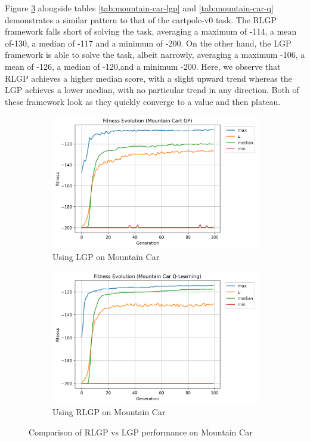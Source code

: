 \documentclass[12pt, final]{dalcsthesis}
\begin{document}
Figure \ref{fig:mountain-car-comparison} alongside tables \ref{tab:mountain-car-lgp} and \ref{tab:mountain-car-q} demonstrates a similar pattern to that of the cartpole-v0 task. The RLGP framework falls short of solving the task, averaging a maximum of -114, a mean of-130, a median of -117 and a minimum of -200. On the other hand, the LGP framework is able to solve the task, albeit narrowly, averaging a maximum -106, a mean of -126, a median of -120,and a minimum -200. Here, we observe that RLGP achieves a higher median score, with a slight upward trend whereas the LGP achieves a lower median, with no particular trend in any direction. Both of these framework look as they quickly converge to a value and then plateau.

\begin{figure}[b]
	\centering
	\begin{subfigure}{1.0\textwidth}
		\includegraphics[width=\linewidth]{mountain_car_lgp.png}
		\caption{Using LGP on Mountain Car}
		\label{fig:mountain-car-lgp}
	\end{subfigure}
	\hfill
	\begin{subfigure}{1.0\textwidth}
		\includegraphics[width=\linewidth]{mountain_car_q.png}
		\caption{Using RLGP on Mountain Car}
		\label{fig:mountain-car-q}
	\end{subfigure}
	\caption{Comparison of RLGP vs LGP performance on Mountain Car}
	\label{fig:mountain-car-comparison}
\end{figure}
\end{document}
